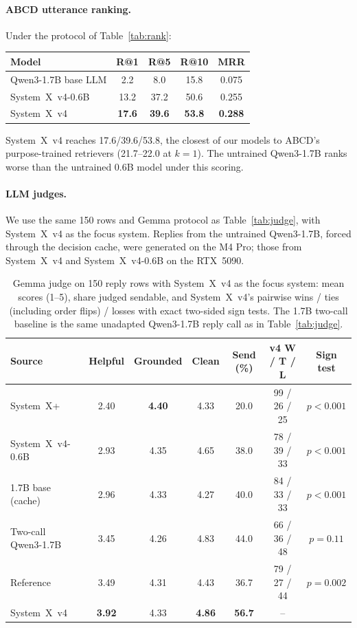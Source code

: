 \documentclass[11pt]{article}
\newcommand{\sysplus}{System~X+}
\newcommand{\sysfour}{System~X~v4}
\newcommand{\sysfoursmall}{System~X~v4-0.6B}
\begin{document}
\paragraph{ABCD utterance ranking.} Under the protocol of Table~\ref{tab:rank}:

\begin{center}
\small
\begin{tabular}{lcccc}
\toprule
Model & R@1 & R@5 & R@10 & MRR \\
\midrule
Qwen3-1.7B base LLM & 2.2 & 8.0 & 15.8 & 0.075 \\
\sysfoursmall{} & 13.2 & 37.2 & 50.6 & 0.255 \\
\sysfour{} & \textbf{17.6} & \textbf{39.6} & \textbf{53.8} & \textbf{0.288} \\
\bottomrule
\end{tabular}
\end{center}

\sysfour{} reaches 17.6/39.6/53.8, the closest of our models to ABCD's purpose-trained retrievers (21.7--22.0 at $k=1$). The untrained Qwen3-1.7B ranks worse than the untrained 0.6B model under this scoring.

\paragraph{LLM judges.} We use the same 150 rows and Gemma protocol as Table~\ref{tab:judge}, with \sysfour{} as the focus system. Replies from the untrained Qwen3-1.7B, forced through the decision cache, were generated on the M4 Pro; those from \sysfour{} and \sysfoursmall{} on the RTX~5090.

\begin{table}[t]
\centering
\caption{Gemma judge on 150 reply rows with \sysfour{} as the focus system: mean scores (1--5), share judged sendable, and \sysfour{}'s pairwise wins / ties (including order flips) / losses with exact two-sided sign tests. The 1.7B two-call baseline is the same unadapted Qwen3-1.7B reply call as in Table~\ref{tab:judge}.}
\label{tab:judge4}
\small
\setlength{\tabcolsep}{4pt}
\begin{tabular}{lcccc|cc}
\toprule
Source & Helpful & Grounded & Clean & Send (\%) & v4 W / T / L & Sign test \\
\midrule
\sysplus{} & 2.40 & \textbf{4.40} & 4.33 & 20.0 & 99 / 26 / 25 & $p<0.001$ \\
\sysfoursmall{} & 2.93 & 4.35 & 4.65 & 38.0 & 78 / 39 / 33 & $p<0.001$ \\
1.7B base (cache) & 2.96 & 4.33 & 4.27 & 40.0 & 84 / 33 / 33 & $p<0.001$ \\
Two-call Qwen3-1.7B & 3.45 & 4.26 & 4.83 & 44.0 & 66 / 36 / 48 & $p=0.11$ \\
Reference & 3.49 & 4.31 & 4.43 & 36.7 & 79 / 27 / 44 & $p=0.002$ \\
\sysfour{} & \textbf{3.92} & 4.33 & \textbf{4.86} & \textbf{56.7} & -- & \\
\bottomrule
\end{tabular}
\end{table}
\end{document}
